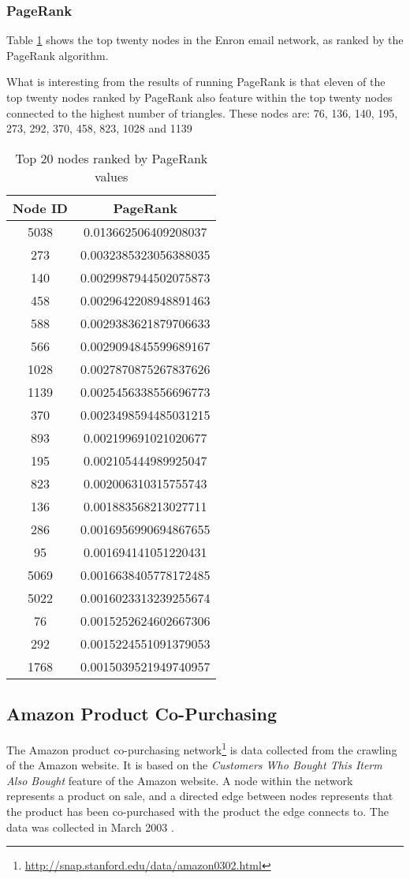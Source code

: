 \subsubsection{PageRank}
Table \ref{tab:enronpagerank} shows the top twenty nodes in the Enron email network, as ranked by the PageRank algorithm.

What is interesting from the results of running PageRank is that eleven of the top twenty nodes ranked by PageRank also feature within the top twenty nodes connected to the highest number of triangles. These nodes are: 76, 136, 140, 195, 273, 292, 370, 458, 823, 1028 and 1139

\begin{table}%
\centering
\begin{tabular}{|c|c|}
\hline
Node ID & PageRank \\
\hline
5038 & 0.013662506409208037 \\
273 & 0.0032385323056388035 \\
140 & 0.0029987944502075873 \\
458 & 0.0029642208948891463 \\
588 & 0.0029383621879706633 \\
566 & 0.0029094845599689167 \\
1028 & 0.0027870875267837626 \\
1139 & 0.0025456338556696773 \\
370 & 0.0023498594485031215 \\
893 & 0.002199691021020677 \\
195 & 0.002105444989925047 \\
823 & 0.002006310315755743 \\
136 & 0.001883568213027711 \\
286 & 0.0016956990694867655 \\
95 & 0.001694141051220431 \\
5069 & 0.0016638405778172485 \\
5022 & 0.0016023313239255674 \\
76 & 0.0015252624602667306 \\
292 & 0.0015224551091379053 \\
1768 & 0.0015039521949740957 \\
\hline
\end{tabular}
\caption{Top 20 nodes ranked by PageRank values}
\label{tab:enronpagerank}
\end{table}

\subsection{Amazon Product Co-Purchasing}
The Amazon product co-purchasing network\footnote{\url{http://snap.stanford.edu/data/amazon0302.html}} is data collected from the crawling of the Amazon website. It is based on the \emph{Customers Who Bought This Iterm Also Bought} feature of the Amazon website. A node within the network represents a product on sale, and a directed edge between nodes represents that the product has been co-purchased with the product the edge connects to. The data was collected in March 2003 \cite{snap}.

